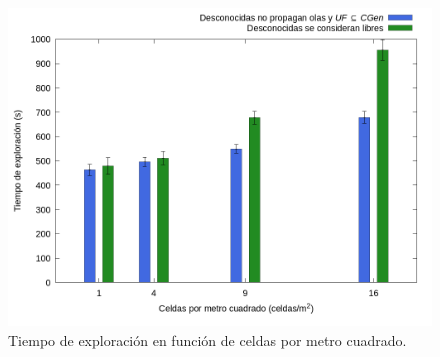 




\begin{figure}[H]
  \centerfloat

  \includegraphics[clip=true, width=\graphlen]{imagenes/graficas_chicas/graficas_histo_num/desconocido/exploration_time.png}

  \caption{Tiempo de exploración en función de celdas por metro cuadrado.}\label{fig:gra:des:et}

\end{figure}

